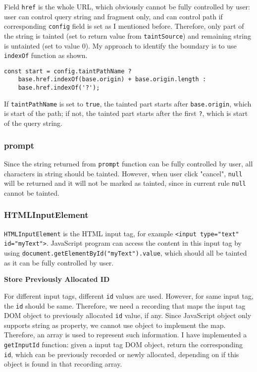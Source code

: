 Field \texttt{href} is the whole URL, which obviously cannot be fully controlled by user: user can control query string and fragment only, and can control path if corresponding \texttt{config} field is set as I mentioned before. Therefore, only part of the string is tainted (set to return value from \texttt{taintSource}) and remaining string is untainted (set to value 0). My approach to identify the boundary is to use \texttt{indexOf} function as shown.

\begin{verbatim}
const start = config.taintPathName ?
	base.href.indexOf(base.origin) + base.origin.length :
	base.href.indexOf('?');
\end{verbatim}

If \texttt{taintPathName} is set to \texttt{true}, the tainted part starts after \texttt{base.origin}, which is start of the path; if not, the tainted part starts after the first \texttt{?}, which is start of the query string.

\subsubsection{prompt}

Since the string returned from \texttt{prompt} function can be fully controlled by user, all characters in string should be tainted. However, when user click "cancel", \texttt{null} will be returned and it will not be marked as tainted, since in current rule \texttt{null} cannot be tainted. 

\subsubsection{HTMLInputElement}

\texttt{HTMLInputElement} is the HTML input tag, for example \texttt{<input type="text" id="myText">}. JavaScript program can access the content in this input tag by using \texttt{document.getElementById("myText").value}, which should all be tainted as it can be fully controlled by user. 

\textbf{Store Previously Allocated ID}

For different input tags, different \texttt{id} values are used. However, for same input tag, the \texttt{id} should be same. Therefore, we need a recording that maps the input tag DOM object to previously allocated \texttt{id} value, if any. Since JavaScript object only supports string as property, we cannot use object to implement the map. Therefore, an array is used to represent such information. I have implemented a \texttt{getInputId} function: given a input tag DOM object, return the corresponding \texttt{id}, which can be previously recorded or newly allocated, depending on if this object is found in that recording array. 

